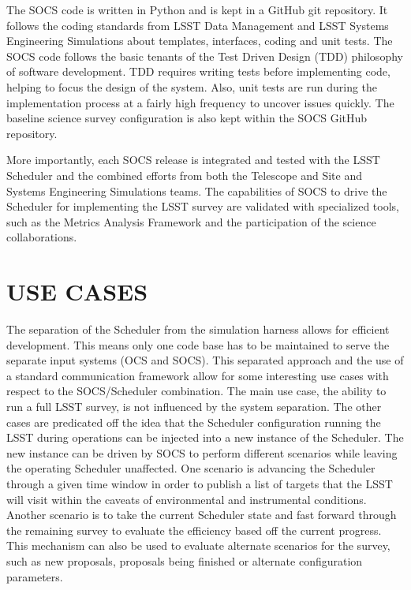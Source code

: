 \documentclass[]{spie}  %
\begin{document}
The SOCS code is written in Python\cite{Python} and is kept in a GitHub\cite{GitHub} git repository. It follows the coding standards\cite{DMPythonStyle} from LSST Data Management and LSST Systems Engineering Simulations about templates, interfaces, coding and unit tests. The SOCS code follows the basic tenants of the Test Driven Design\cite{Beck2002,Astels2003} (TDD) philosophy of software development. TDD requires writing tests before implementing code, helping to focus the design of the system. Also, unit tests are run during the implementation process at a fairly high frequency to uncover issues quickly. The baseline science survey configuration is also kept within the SOCS GitHub repository.

More importantly, each SOCS release is integrated and tested with the LSST Scheduler and the combined efforts from both the Telescope and Site and Systems Engineering Simulations teams. The capabilities of SOCS to drive the Scheduler for implementing the LSST survey are validated with specialized tools, such as the Metrics Analysis Framework\cite{2014SPIE.9149E..0BJ} and the participation of the science collaborations.

\section{USE CASES}

The separation of the Scheduler from the simulation harness allows for efficient development. This means only one code base has to be maintained to serve the separate input systems (OCS and SOCS). This separated approach and the use of a standard communication framework allow for some interesting use cases with respect to the SOCS/Scheduler combination. The main use case, the ability to run a full LSST survey, is not influenced by the system separation. The other cases are predicated off the idea that the Scheduler configuration running the LSST during operations can be injected into a new instance of the Scheduler. The new instance can be driven by SOCS to perform different scenarios while leaving the operating Scheduler unaffected. One scenario is advancing the Scheduler through a given time window in order to publish a list of targets that the LSST will visit within the caveats of environmental and instrumental conditions. Another scenario is to take the current Scheduler state and fast forward through the remaining survey to evaluate the efficiency based off the current progress. This mechanism can also be used to evaluate alternate scenarios for the survey, such as new proposals, proposals being finished or alternate configuration parameters.
\end{document}
